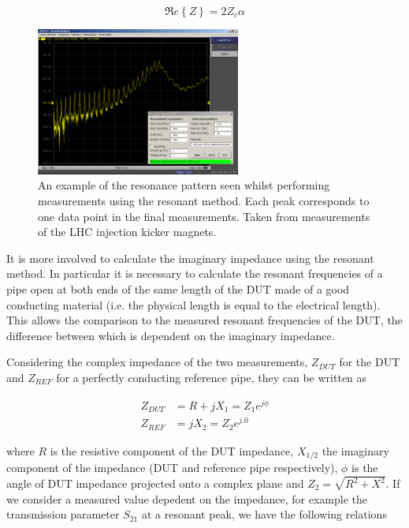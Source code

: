 \begin{equation}
\Re e\left\{ Z \right\} = 2Z_{c} \alpha
\label{eqn:res_imp}
\end{equation}

\begin{figure}
\begin{center}
\includegraphics[width=0.6\textwidth]{Bench_Top_Measurements/figures/coax-resonator.png}
\end{center}
\caption{An example of the resonance pattern seen whilst performing measurements using the resonant method. Each peak corresponds to one data point in the final measurements. Taken from measurements of the LHC injection kicker magnets.}
\label{fig:res-resonancce-examples}
\end{figure}

It is more involved to calculate the imaginary impedance using the resonant method. In particular it is necessary to calculate the resonant frequencies of a pipe open at both ends of the same length of the DUT made of a good conducting material (i.e. the physical length is equal to the electrical length). This allows the comparison to the measured resonant frequencies of the DUT, the difference between which is dependent on the imaginary impedance.

Considering the complex impedance of the two measurements, $Z_{DUT}$ for the DUT and $Z_{REF}$ for a perfectly conducting reference pipe, they can be written as

\begin{align}
Z_{DUT} & =  R + jX_{1}  =  Z_{1}e^{j \phi} \\
Z_{REF} & =  jX_{2}  =  Z_{2}e^{j.0}
\end{align}

where $R$ is the resistive component of the DUT impedance, $X_{1/2}$ the imaginary component of the impedance (DUT and reference pipe respectively), $\phi$ is the angle of DUT impedance projected onto a complex plane and $Z_{2} = \sqrt{R^{2} + X^{2}}$. If we consider a measured value depedent on the impedance, for example the transmission parameter $S_{21}$ at a resonant peak, we have the following relations

